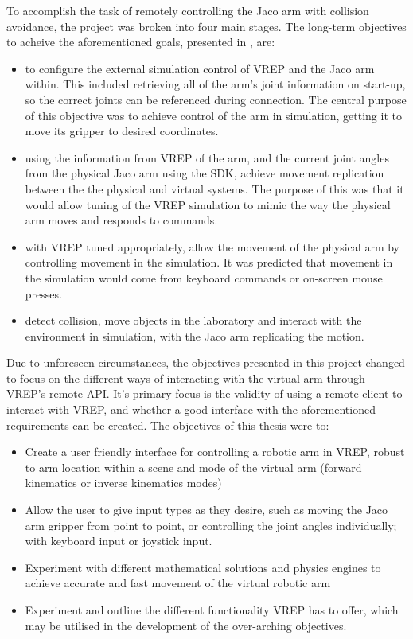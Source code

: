 \documentclass[12pt,openany,a4paper]{book}
\begin{document}
To accomplish the task of remotely controlling the Jaco arm with collision avoidance, the project was broken into four main stages. The long-term objectives to acheive the aforementioned goals, presented in \label{Original Objectives}, are:

\begin{itemize}
	\item to configure the external simulation control of VREP and the Jaco arm within. This included retrieving all of the arm's joint information on start-up, so the correct joints can be referenced during connection. The central purpose of this objective was to achieve control of the arm in simulation, getting it to move its gripper to desired coordinates.
	\item using the information from VREP of the arm, and the current joint angles from the physical Jaco arm using the SDK, achieve movement replication between the the physical and virtual systems. The purpose of this was that it would allow tuning of the VREP simulation to mimic the way the physical arm moves and responds to commands.
	\item with VREP tuned appropriately, allow the movement of the physical arm by controlling movement in the simulation. It was predicted that movement in the simulation would come from keyboard commands or on-screen mouse presses.
	\item detect collision, move objects in the laboratory and interact with the environment in simulation, with the Jaco arm replicating the motion.

\end{itemize}


Due to unforeseen circumstances, the objectives presented in this project changed to focus on the different ways of interacting with the virtual arm through VREP's remote API. It's primary focus is the validity of using a remote client to interact with VREP, and whether a good interface with the aforementioned requirements can be created. The objectives of this thesis were to:

\begin{itemize}
	\item Create a user friendly interface for controlling a robotic arm in VREP, robust to arm location within a scene and mode of the virtual arm (forward kinematics or inverse kinematics modes)
	\item Allow the user to give input types as they desire, such as moving the Jaco arm gripper from point to point, or controlling the joint angles individually; with keyboard input or joystick input.
	\item Experiment with different mathematical solutions and physics engines to achieve accurate and fast movement of the virtual robotic arm
	\item Experiment and outline the different functionality VREP has to offer, which may be utilised in the development of the over-arching objectives.
\end{itemize}
\end{document}
